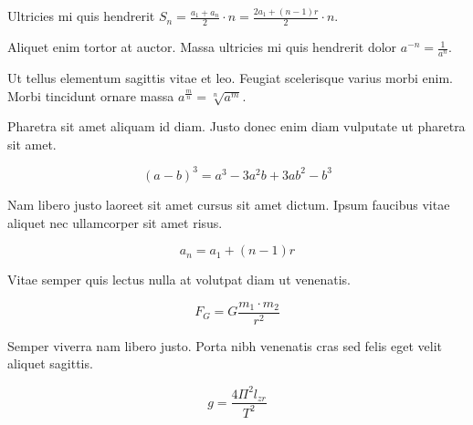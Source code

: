 \documentclass{article}
\begin{document}
Ultricies mi quis hendrerit \begin{math}
	S_{n}=\frac{a_{1}+a_{n}}{2}\cdot n=\frac{2a_{1}+(n-1)r}{2}\cdot n
\end{math}.\newline

Aliquet enim tortor at auctor. Massa ultricies mi quis hendrerit dolor $ a^{-n}=\frac{1}{a^{n}} $.\newline

Ut tellus elementum sagittis vitae et leo. Feugiat scelerisque varius morbi enim. Morbi tincidunt ornare massa \( a^{\frac{m}{n}}=\sqrt[n]{a^{m}} \).\newline

Pharetra sit amet aliquam id diam. Justo donec enim diam vulputate ut pharetra sit amet.

\[ (a-b)^{3}=a^{3}-3a^{2}b+3ab^{2}-b^{3} \]

Nam libero justo laoreet sit amet cursus sit amet dictum. Ipsum faucibus vitae aliquet nec ullamcorper sit amet risus.

$$ a_{n}=a_{1}+(n-1)r $$

Vitae semper quis lectus nulla at volutpat diam ut venenatis.

\begin{displaymath}
	F_{G}=G\frac{m_1\cdot m_2}{r^2}
\end{displaymath}

Semper viverra nam libero justo. Porta nibh venenatis cras sed felis eget velit aliquet sagittis.

\begin{equation}
	g=\frac{4\Pi^2l_{zr}}{T^2}
\end{equation}
\end{document}
